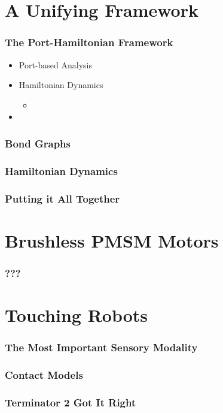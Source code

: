 \documentclass[aspectratio=169]{beamer}
\begin{document}
	\section{A Unifying Framework}
		\begin{frame}
			\frametitle{The Port-Hamiltonian Framework}
			\begin{itemize}
				\item Port-based Analysis
				\item Hamiltonian Dynamics
					\begin{itemize}
						\item 
					\end{itemize}
				\item
			\end{itemize}
		\end{frame}
	
		\begin{frame}
			\frametitle{Bond Graphs}
			
		\end{frame}

		\begin{frame}
			\frametitle{Hamiltonian Dynamics}
			
		\end{frame}

		\begin{frame}
			\frametitle{Putting it All Together}
			
		\end{frame}
	
	\section{Brushless PMSM Motors}
		
		\begin{frame}
			\frametitle{???}
		\end{frame}
	
	\section{Touching Robots}
	
		\begin{frame}
			\frametitle{The Most Important Sensory Modality}
		\end{frame}
	
		\begin{frame}
			\frametitle{Contact Models}
		\end{frame}
		
		\begin{frame}
			\frametitle{Terminator 2 Got It Right}
			\begin{center}
			\end{center}
		\end{frame}
\end{document}
